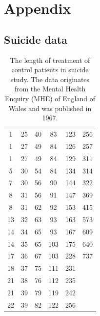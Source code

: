 \documentclass[../Thesis.tex]{subfiles}
\begin{document}
\chapter{Appendix}

\section{Suicide data}
\begin{table}[H]
    \centering
    \begin{tabular}{cccccc}
1 & 25 & 40 & 83 & 123 & 256 \\
1 & 27 & 49 & 84 & 126 & 257 \\
1 & 27 & 49 & 84 & 129 & 311 \\
5 & 30 & 54 & 84 & 134 & 314 \\
7 & 30 & 56 & 90 & 144 & 322 \\
8 & 31 & 56 & 91 & 147 & 369 \\
8 & 31 & 62 & 92 & 153 & 415 \\
13 & 32 & 63 & 93 & 163 & 573 \\
14 & 34 & 65 & 93 & 167 & 609 \\
14 & 35 & 65 & 103 & 175 & 640 \\
17 & 36 & 67 & 103 & 228 & 737 \\
18 & 37 & 75 & 111 & 231 \\
21 & 38 & 76 & 112 & 235 \\
21 & 39 & 79 & 119 & 242 \\
22 & 39 & 82 & 122 & 256
    \end{tabular}
    \caption{The length of treatment of control patients in suicide study. The data originates from the Mental Health Enquiry (MHE) of England of Wales and was published in 1967.}
    \label{tab:suicide data}
\end{table}

\newpage
\end{document}
